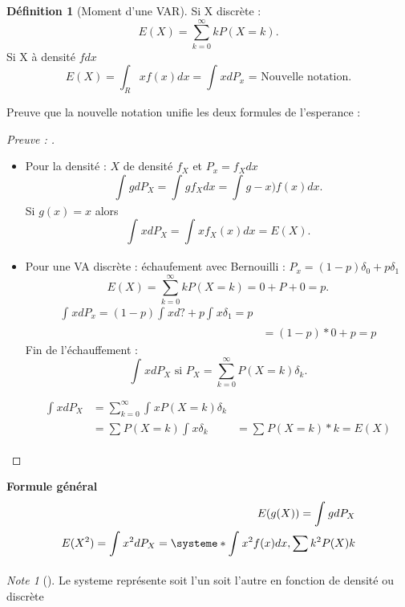 \documentclass{article}
\theoremstyle{plain}%
\theoremstyle{definition}
\newtheorem{defn}{Définition}[section]
\theoremstyle{remark}
\newtheorem*{note}{Note}
\begin{document}
\begin{defn}[Moment d'une VAR]
    Si X discrète : 
    \[
        E(X) = \sum_{k=0}^{\infty }kP(X=k)
    .\]
    Si X à densité $ fdx $ 
    \[
        E(X) = \int_{R}^{}xf(x)dx = \int_{}^{}xdP_x \text{ = Nouvelle notation}
    .\]
    
    Preuve que la nouvelle notation unifie les deux formules de l'esperance : \begin{proof}[Preuve : ]
        \begin{itemize}
            \item Pour la densité : $ X $ de densité $ f_X $ et $ P_x = f_X dx $ 
            \[
                \int_{}^{}gdP_X = \int_{}^{}gf_X dx = \int_{}^{}g-x)f(x) dx 
            .\]
            Si $ g(x) = x $ alors 
            \[
                \int_{}^{}xdP_X = \int_{}^{}xf_X(x)dx = E(X)
            .\]
            
            \item Pour une VA discrète : échaufement avec Bernouilli : $ P_x = (1-p)\delta _0 + p \delta _1$ 
            \[
                E(X) = \sum_{k=0}^{\infty } kP(X=k)=0+P+0 = p
            .\] 
            \begin{align*}
                \int_{}^{}xdP_x = (1-p)\int_{}^{}xd? + p \int_{}^{}x \delta _1 = p \\
                                &= (1-p)*0 + p = p 
            \end{align*}
            Fin de l'échauffement : 
            \[
                \int_{}^{}xdP_X \text{ si } P_X = \sum_{k=0}^{\infty }P(X=k) \delta _k
            .\]
            
            
            \begin{align*}
                \int_{}^{}xdP_X &= \sum_{k=0}^{\infty }\int_{}^{}xP(X=k) \delta _k \\
                &= \sum_{}^{}P(X=k) \int_{}^{}x \delta _k
                &= \sum_{}^{}P(X=k) * k = E(X)            
            \end{align*}      
            
        \end{itemize}
    \end{proof}

    \textbf{Formule général}
    \begin{align*}
        E(g(X)) = \int_{}^{}gdP_X \\
        E(X^2) = \int_{}^{}x^2 dP_X = \systeme*{
            \int_{}^{}x^2 f(x) dx ,
            \sum_{}^{}k^2 P(X)k
        }        
    \end{align*}
    \begin{note}[]
        Le systeme représente soit l'un soit l'autre en fonction de densité ou discrète
    \end{note}
\end{defn}
\end{document}
